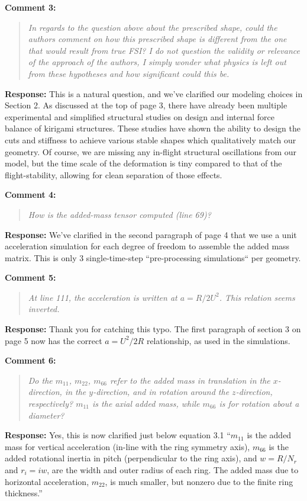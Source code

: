 \documentclass[11pt]{article}
\newenvironment{comment}[1]{\vspace{4mm}\par\noindent\textbf{Comment #1:}\begin{quote}\itshape}{\end{quote}}\newcommand{\response}[1]{\par\noindent\textbf{Response:} #1}
\begin{document}
\begin{comment}3
In regards to the question above about the prescribed shape, could the authors comment on how this prescribed shape is different from the one that would result from true FSI? I do not question the validity or relevance of the approach of the authors, I simply wonder what physics is left out from these hypotheses and how significant could this be.
\end{comment}
\response{}
This is a natural question, and we've clarified our modeling choices in Section 2. As discussed at the top of page 3, there have already been multiple experimental and simplified structural studies on design and internal force balance of kirigami structures. These studies have shown the ability to design the cuts and stiffness to achieve various stable shapes which qualitatively match our geometry. Of course, we are missing any in-flight structural oscillations from our model, but the time scale of the deformation is tiny compared to that of the flight-stability, allowing for clean separation of those effects. 

\begin{comment}4
How is the added-mass tensor computed (line 69)?
\end{comment}
\response{}
We've clarified in the second paragraph of page 4 that we use a unit acceleration simulation for each degree of freedom to assemble the added mass matrix. This is only 3 single-time-step ``pre-processing simulations`` per geometry. 

\begin{comment}5
At line 111, the acceleration is written at $a=R/2U^2$. This relation seems inverted.
\end{comment}
\response{}
Thank you for catching this typo. The first paragraph of section 3 on page 5 now has the correct $a=U^2/2R$ relationship, as used in the simulations.

\begin{comment}6
Do the $m_{11}$, $m_{22}$, $m_{66}$ refer to the added mass in translation in the
$x$-direction, in the $y$-direction, and in rotation around the $z$-direction,
respectively? $m_{11}$ is the axial added mass, while $m_{66}$ is for rotation about
a diameter?
\end{comment}
\response{}
Yes, this is now clarified just below equation 3.1 ``$m_{11}$ is the added mass for vertical acceleration (in-line with the ring symmetry axis), $m_{66}$ is the added rotational inertia in pitch (perpendicular to the ring axis), and $w = R/N_r$ and $r_i=iw$, are the width and outer radius of each ring. The added mass due to horizontal acceleration, $m_{22}$, is much smaller, but nonzero due to the finite ring thickness.''
\end{document}
